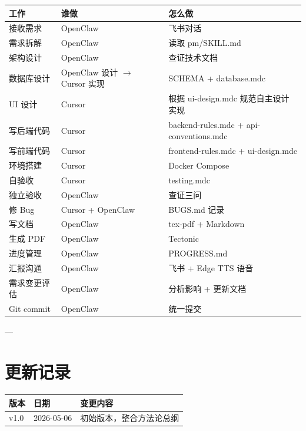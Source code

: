 \documentclass[11pt,a4paper]{article}
\begin{document}
\begin{table}[h]
\centering
\begin{tabularx}{\linewidth}{llX}
\toprule
\textbf{工作} & \textbf{谁做} & \textbf{怎么做} \\
\midrule
接收需求 & OpenClaw & 飞书对话 \\
需求拆解 & OpenClaw & 读取 pm/SKILL.md \\
架构设计 & OpenClaw & 查证技术文档 \\
数据库设计 & OpenClaw 设计 $\to$ Cursor 实现 & SCHEMA + database.mdc \\
UI 设计 & Cursor & 根据 ui-design.mdc 规范自主设计实现 \\
写后端代码 & Cursor & backend-rules.mdc + api-conventions.mdc \\
写前端代码 & Cursor & frontend-rules.mdc + ui-design.mdc \\
环境搭建 & Cursor & Docker Compose \\
自验收 & Cursor & testing.mdc \\
独立验收 & OpenClaw & 查证三问 \\
修 Bug & Cursor + OpenClaw & BUGS.md 记录 \\
写文档 & OpenClaw & tex-pdf + Markdown \\
生成 PDF & OpenClaw & Tectonic \\
进度管理 & OpenClaw & PROGRESS.md \\
汇报沟通 & OpenClaw & 飞书 + Edge TTS 语音 \\
需求变更评估 & OpenClaw & 分析影响 + 更新文档 \\
Git commit & OpenClaw & 统一提交 \\
\bottomrule
\end{tabularx}
\end{table}

---

\section{更新记录}

\begin{tabular}{lll}
\toprule
版本 & 日期 & 变更内容 \\
\midrule
v1.0 & 2026-05-06 & 初始版本，整合方法论总纲 \\
\bottomrule
\end{tabular}
\end{document}
